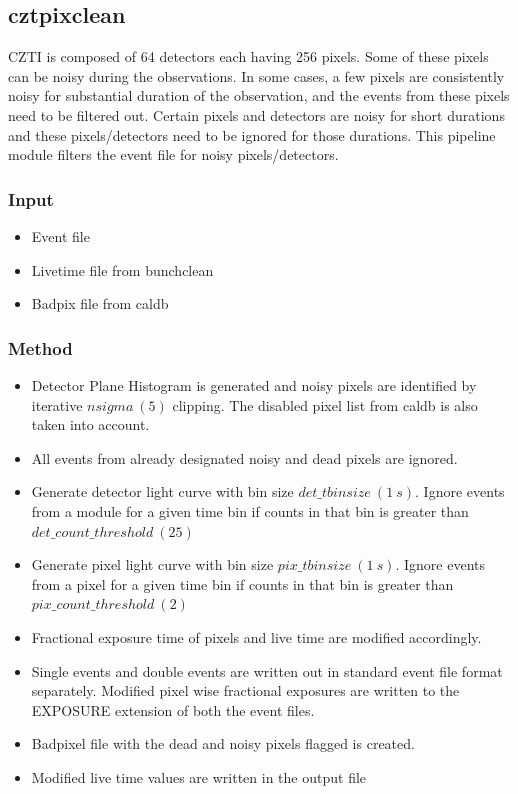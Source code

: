\documentclass[11pt,oneside,a4paper]{article}
\begin{document}

\subsection{cztpixclean}
CZTI is composed of 64 detectors each having 256 pixels. Some of these pixels can be 
noisy during the observations. In some cases, a few pixels are consistently noisy for 
substantial duration of the observation, and the events from these pixels need 
to be filtered out. Certain pixels and detectors are noisy for short durations and 
these pixels/detectors need to be ignored for those durations. This pipeline module 
filters the event file for noisy pixels/detectors.

\subsubsection*{Input}
\renewcommand\labelitemi{{\boldmath$\cdot$}}
\begin{itemize}
\item{Event file}
\item{Livetime file from bunchclean}
\item{Badpix file from caldb}
\end{itemize}
\subsubsection*{Method}
\begin{itemize}
\item{Detector Plane Histogram is generated and noisy pixels are identified
by iterative $nsigma~(5)$ clipping. The disabled pixel list from caldb is also
taken into account.}
\item{All events from already designated noisy and dead pixels are ignored.}
\item{Generate detector light curve with bin size $det\_tbinsize~(1~s)$. Ignore events from a
module for a given time bin if counts in that bin is greater than $det\_count\_threshold~(25)$}
\item{Generate pixel light curve with bin size $pix\_tbinsize~(1~s)$. Ignore events from a
pixel for a given time bin if counts in that bin is greater than $pix\_count\_threshold~(2)$}
\item{Fractional exposure time of pixels and live time are modified accordingly.}
\item{Single events and double events are written out in standard event file format
separately. Modified pixel wise fractional exposures are written to the EXPOSURE extension
of both the event files.}
\item{Badpixel file with the dead and noisy pixels flagged is created.}
\item{Modified live time values are written in the output file}
\end{itemize}
\end{document}
